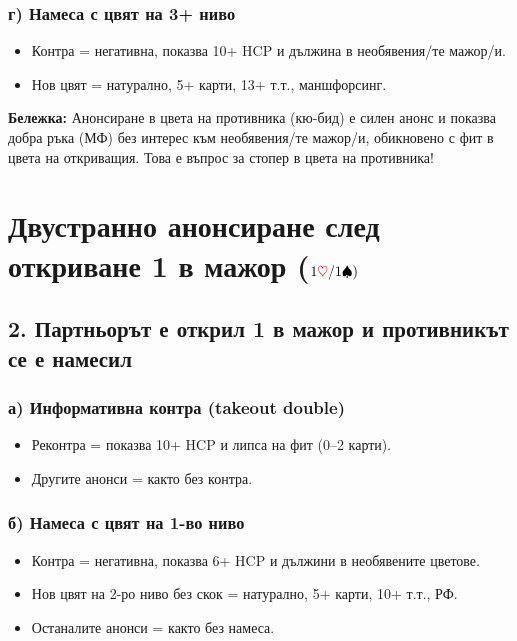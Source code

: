 \documentclass[10pt,a5paper]{extarticle}
\newcommand{\Rheart}{\textcolor{red}{\heartsuit}}
\newcommand{\Bspade}{\textcolor{black}{\spadesuit}}
\begin{document}
\subsubsection*{г) Намеса с цвят на 3+ ниво}
\begin{itemize}
  \item[] Контра = негативна, показва 10+ HCP и дължина в необявения/те мажор/и.
  \item[] Нов цвят = натурално, 5+ карти, 13+ т.т., маншфорсинг.
\end{itemize}

\bigskip
\textbf{Бележка:}  
Анонсиране в цвета на противника (кю-бид) е силен анонс и показва добра ръка (МФ) без интерес към необявения/те мажор/и, обикновено с фит в цвета на откриващия. Това е въпрос за стопер в цвета на противника!
\newpage
\section{Двустранно анонсиране след откриване 1 в мажор ($1\Rheart/1\Bspade)$}

\subsection*{2. Партньорът е открил 1 в мажор и противникът се е намесил}

\subsubsection*{а) Информативна контра (takeout double)}
\begin{itemize}
  \item[] Реконтра = показва 10+ HCP и липса на фит (0--2 карти).
  \item[] Другите анонси = както без контра.
\end{itemize}

\subsubsection*{б) Намеса с цвят на 1-во ниво}
\begin{itemize}
  \item[] Контра = негативна, показва 6+ HCP и дължини в необявените цветове.
  \item[] Нов цвят на 2-ро ниво без скок = натурално, 5+ карти, 10+ т.т., РФ.
  \item[] Останалите анонси = както без намеса.
\end{itemize}
\end{document}
